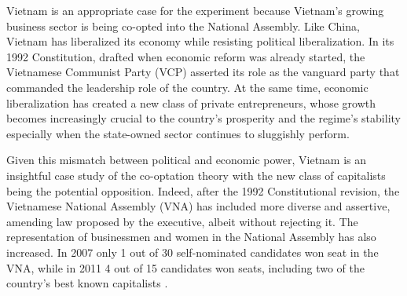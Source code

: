 Vietnam is an appropriate case for the experiment because Vietnam's growing business sector is being co-opted into the National Assembly. Like China, Vietnam has liberalized its economy while resisting political liberalization. In its 1992 Constitution, drafted when economic reform was already started, the Vietnamese Communist Party (VCP) asserted its role as the vanguard party that commanded the leadership role of the country. At the same time, economic liberalization has created a new class of private entrepreneurs, whose growth becomes increasingly crucial to the country's prosperity and the regime's stability especially when the state-owned sector continues to sluggishly perform. 

Given this mismatch between political and economic power, Vietnam is an insightful case study of the co-optation theory with the new class of capitalists being the potential opposition. Indeed, after the 1992 Constitutional revision, the Vietnamese National Assembly (VNA) has included more diverse and assertive, amending law proposed by the executive, albeit without rejecting it. The representation of businessmen and women in the National Assembly has also increased. In 2007 only 1 out of 30 self-nominated candidates won seat in the VNA, while in 2011 4 out of 15 candidates won seats, including two of the country's best known capitalists \citep{Ruwitch2011}.


